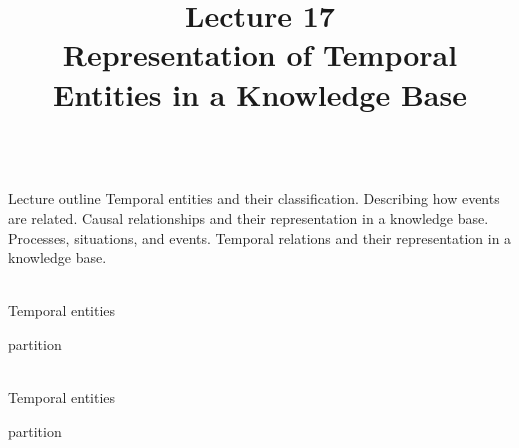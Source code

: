 \title{Lecture 17\\Representation of Temporal Entities in a Knowledge Base}

\begin{frame}
	\titlepage
\end{frame}

\begin{frame}{\\Lecture outline}
	\topline
	\justifying
	Temporal entities and their classification. Describing how events are related. Causal relationships and their representation in a knowledge base. Processes, situations, and events. Temporal relations and their representation in a knowledge base.
\end{frame}

\begin{frame}{\\Temporal entities}
	\topline
	\justifying
	\begin{scnrelfromset}{partition}
	\end{scnrelfromset}
\end{frame}

\begin{frame}{\\Temporal entities}
	\topline
	\justifying
	\begin{scnrelfromset}{partition}
		\begin{scnindent}
		\end{scnindent}
	\end{scnrelfromset}
\end{frame}

